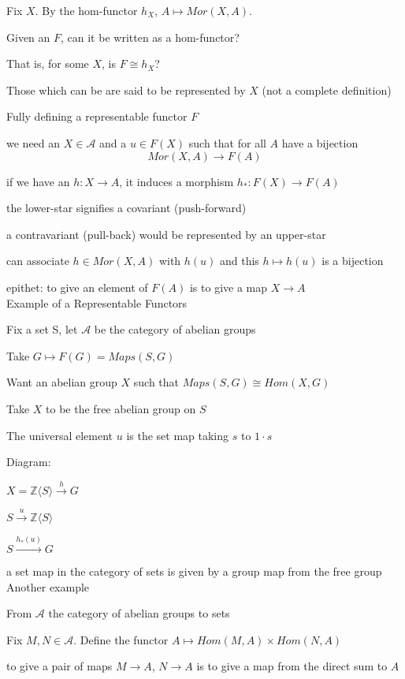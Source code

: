 \documentclass[12pt]{article}
\begin{document}
Fix $X$.  By the hom-functor $h_X$, $A \mapsto Mor(X, A)$.

Given an $F$, can it be written as a hom-functor?

That is, for some $X$, is $F \cong h_X$?

Those which can be are said to be represented by $X$ (not a complete definition)

\noindent
Fully defining a representable functor $F$

we need an $X \in \mathcal{A}$ and a $u \in F(X)$ such that for all $A$ have a bijection $$Mor(X, A) \to F(A)$$

if we have an $h: X \to A$, it induces a morphism $h_*: F(X) \to F(A)$

the lower-star signifies a covariant (push-forward)

a contravariant (pull-back) would be represented by an upper-star

can associate $h \in Mor(X, A)$ with $h(u)$ and this $h \mapsto h(u)$ is a bijection

epithet: to give an element of $F(A)$ is to give a map $X \to A$\\

\noindent
Example of a Representable Functors

Fix a set S, let $\mathcal{A}$ be the category of abelian groups

Take $G \mapsto F(G) = Maps(S, G)$

Want an abelian group $X$ such that $Maps(S, G) \cong Hom(X, G)$

Take $X$ to be the free abelian group on $S$

The universal element $u$ is the set map taking $s$ to $1 \cdot s$

\noindent
Diagram:

$X = \mathds{Z}\langle S \rangle \xrightarrow{h} G$

$S \xrightarrow{u} \mathds{Z}\langle S \rangle$

$S \xrightarrow{h_*(u)} G$

\noindent
a set map in the category of sets is given by a group map from the free group\\

\noindent
Another example

From $\mathcal{A}$ the category of abelian groups to sets

Fix $M, N \in \mathcal{A}$.  Define the functor $A \mapsto Hom(M, A) \times Hom(N, A)$

to give a pair of maps $M \to A$, $N \to A$ is to give a map from the direct sum to $A$
\end{document}
